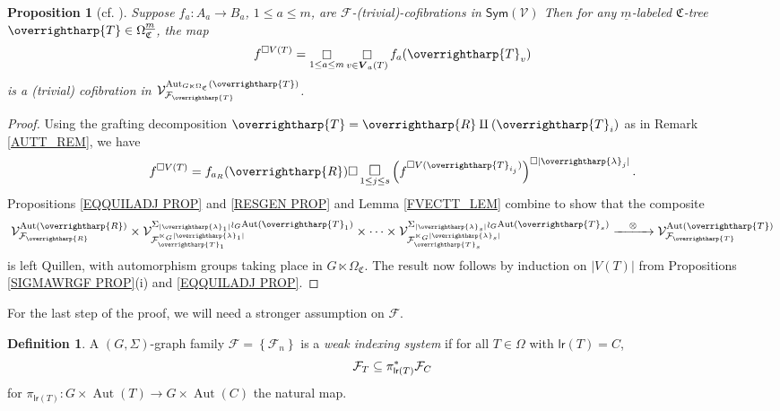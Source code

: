 \documentclass[a4paper,10pt
,draft
]{article}%
\numberwithin{equation}{section}
\numberwithin{figure}{section}
\newtheorem{proposition}[equation]{Proposition}%
\theoremstyle{definition} %
\newtheorem{definition}[equation]{Definition}%
\newcommand{\set}[1]{\left\{#1\right\}}%
\newcommand{\vect}[1]{\text{\overrightharp{\ensuremath{#1}}}}
\newcommand{\Sym}{\ensuremath{\mathsf{Sym}}}%
\DeclareMathOperator{\Aut}{Aut}%
\newcommand{\F}{\ensuremath{\mathcal F}}
\newcommand{\V}{\ensuremath{\mathcal V}}
\newcommand{\1}{\ensuremath{\mathbbm 1}}%
\begin{document}
\begin{proposition}[{cf. \cite[Prop. 6.52]{BP_geo}}]
      \label{BOXVT_PROP}
      Suppose $f_a: A_a \to B_a$, $1 \leq a \leq m$, are $\F$-(trivial)-cofibrations in $\Sym(\V)$
      Then for any $\underline{m}$-labeled $\mathfrak C$-tree $\vect T \in \Omega^{\underline{m}}_{\mathfrak C}$, the map
      \[
            f^{\square V(T)} = \mathop{\square}\limits_{1 \leq a \leq m} \mathop{\square}\limits_{v \in \boldsymbol{V}_a(T)} f_a(\vect T_v)
      \]
      is a (trivial) cofibration in $\V^{\Aut_{G \ltimes \Omega_{\mathfrak C}}(\vect T)}_{\F_{\vect T}}$.
\end{proposition}
\begin{proof}
      Using the grafting decomposition $\vect T = \vect R \amalg (\vect T_i)$ as in Remark \ref{AUTT_REM}, we have
      \[
            f^{\square V(T)} = f_{a_R}(\vect R) \square \mathop{\mathlarger{\square}}\limits_{1 \leq j \leq s}\left(f^{\square V(\vect T_{i_j})}\right)^{\square |\vect \lambda_j|}.
      \]
      Propositions \ref{EQQUILADJ PROP} and \ref{RESGEN PROP} and Lemma \ref{FVECTT_LEM} %
      combine to show that the composite
      \[
            \V^{\Aut(\vect R)}_{\F_{\vect R}} \times
            \V^{\Sigma_{|\vect \lambda_1|} \wr_G \Aut(\vect T_1)}_{\F_{\vect T_1}^{\ltimes_G |\vect \lambda_1|}}
            \times %
            \dots
            \times %
            \V^{\Sigma_{|\vect \lambda_s|} \wr_G \Aut(\vect T_s)}_{\F_{\vect T_s}^{\ltimes_G |\vect \lambda_s|}}
            \xrightarrow{\quad \otimes \quad}
            \V^{\Aut(\vect T)}_{\F_{\vect T}}
      \]
      is left Quillen,
      with automorphism groups taking place in $G \ltimes \Omega_{\mathfrak C}$. 
      The result now follows by induction on $|V(T)|$ from Propositions \ref{SIGMAWRGF PROP}(i) and \ref{EQQUILADJ PROP}.
\end{proof}

For the last step of the proof, we will need a stronger assumption on $\F$.
\begin{definition}
      \label{WIS_DEF}
      A $(G,\Sigma)$-graph family $\F = \set{\F_n}$ is a \textit{weak indexing system} if
      for all $T \in \Omega$ with $\mathsf{lr}(T) = C$,
      \begin{equation}
            \label{WIS_EQ}
            \F_T \subseteq \pi_{\mathsf{lr}(T)}^{\**} \F_C
      \end{equation}
      for $\pi_{\mathsf{lr}(T)} \colon G \times \Aut(T) \to G \times \Aut(C)$ the natural map.
\end{definition}
\end{document}
